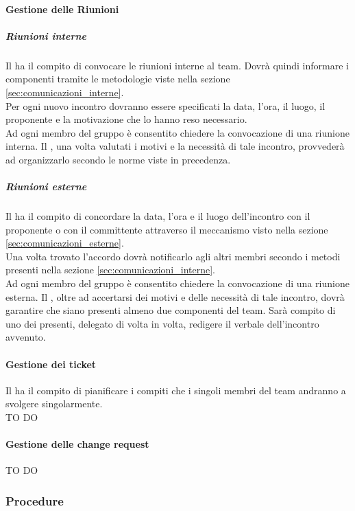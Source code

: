 			\paragraph{Gestione delle Riunioni}
				\subparagraph{Riunioni interne}
				Il \roleProjectManager{} ha il compito di convocare le riunioni interne al team. Dovrà quindi informare i componenti tramite le metodologie viste nella sezione \ref{sec:comunicazioni_interne}.\\
				Per ogni nuovo incontro dovranno essere specificati la data, l’ora, il luogo, il proponente e la motivazione che lo hanno reso necessario. \\
				Ad ogni membro del gruppo è consentito chiedere la convocazione di una riunione interna. Il \roleProjectManager{}, una volta valutati i motivi e la necessità di tale incontro, provvederà ad organizzarlo secondo le norme viste in precedenza.
				\subparagraph{Riunioni esterne} \label{sec:riunioni_esterne}
				Il \roleProjectManager{} ha il compito di concordare la data, l’ora e il luogo dell'incontro con il proponente o con il committente attraverso 	il meccanismo visto nella sezione \ref{sec:comunicazioni_esterne}. \\
				Una volta trovato l'accordo dovrà notificarlo agli altri membri secondo i metodi presenti nella sezione \ref{sec:comunicazioni_interne}. \\
				Ad ogni membro del gruppo è consentito chiedere la convocazione di una riunione esterna. Il \roleProjectManager, oltre ad accertarsi dei motivi e delle necessità di tale incontro, dovrà garantire che siano presenti almeno due componenti del team. Sarà compito di uno dei presenti, delegato di volta in volta, redigere il verbale dell’incontro avvenuto.
				
			\paragraph{Gestione dei ticket} \label{sec:gestione_dei_ticket}
			Il \roleProjectManager{} ha il compito di pianificare i compiti che i singoli membri del team andranno a svolgere singolarmente. \\
			TO DO
			\paragraph{Gestione delle change request}
			TO DO
			
					
		\subsubsection{Procedure}
